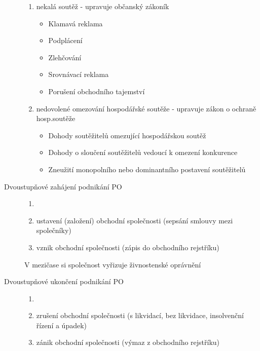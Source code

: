 \begin{description}
            \begin{enumerate}
                \item nekalá soutěž - upravuje občanský zákoník
                \begin{itemize}
                    \item Klamavá reklama
                    \item Podplácení
                    \item Zlehčování
                    \item Srovnávací reklama
                    \item Porušení obchodního tajemství
                \end{itemize}
                \item nedovolené omezování hospodářské soutěže - upravuje zákon o ochraně hosp.soutěže
                \begin{itemize}
                    \item Dohody soutěžitelů omezující hospodářskou soutěž
                    \item Dohody o sloučení soutěžitelů vedoucí k omezení konkurence
                    \item Zneužití monopolního nebo dominantního postavení soutěžitelů
                \end{itemize}
            \end{enumerate}
        \item[Dvoustupňové zahájení podnikání PO]
            \begin{enumerate}
                \item []
                \item ustavení (založení) obchodní společnosti (sepsání smlouvy mezi společníky)
                \item vznik obchodní společnosti (zápis do obchodního rejstříku)			
            \end{enumerate}
            V mezičase si společnost vyřizuje živnostenské oprávnění
        \item[Dvoustupňové ukončení podnikání PO]
            \begin{enumerate}
                \item []
                \item zrušení obchodní společnosti (s likvidací, bez likvidace, insolvenční řízení a úpadek)
                \item zánik obchodní společnosti (výmaz z obchodního rejstříku)
            \end{enumerate}

\end{description}
